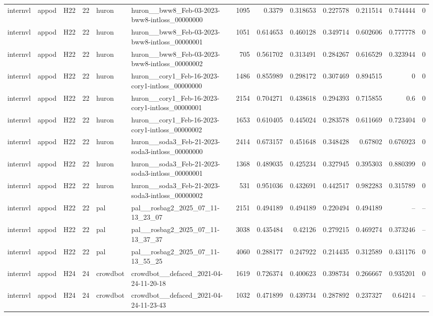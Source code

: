 \begin{longtable}{lllrllrrrrrrr}
internvl & appod & H22 & 22 & huron & huron\_\_bww8\_Feb-03-2023-bww8-intloss\_00000000 & 1095 & 0.3379 & 0.318653 & 0.227578 & 0.211514 & 0.744444 & 0 \\
internvl & appod & H22 & 22 & huron & huron\_\_bww8\_Feb-03-2023-bww8-intloss\_00000001 & 1051 & 0.614653 & 0.460128 & 0.349714 & 0.602606 & 0.777778 & 0 \\
internvl & appod & H22 & 22 & huron & huron\_\_bww8\_Feb-03-2023-bww8-intloss\_00000002 & 705 & 0.561702 & 0.313491 & 0.284267 & 0.616529 & 0.323944 & 0 \\
internvl & appod & H22 & 22 & huron & huron\_\_cory1\_Feb-16-2023-cory1-intloss\_00000000 & 1486 & 0.855989 & 0.298172 & 0.307469 & 0.894515 & 0 & 0 \\
internvl & appod & H22 & 22 & huron & huron\_\_cory1\_Feb-16-2023-cory1-intloss\_00000001 & 2154 & 0.704271 & 0.438618 & 0.294393 & 0.715855 & 0.6 & 0 \\
internvl & appod & H22 & 22 & huron & huron\_\_cory1\_Feb-16-2023-cory1-intloss\_00000002 & 1653 & 0.610405 & 0.445024 & 0.283578 & 0.611669 & 0.723404 & 0 \\
internvl & appod & H22 & 22 & huron & huron\_\_soda3\_Feb-21-2023-soda3-intloss\_00000000 & 2414 & 0.673157 & 0.451648 & 0.348428 & 0.67802 & 0.676923 & 0 \\
internvl & appod & H22 & 22 & huron & huron\_\_soda3\_Feb-21-2023-soda3-intloss\_00000001 & 1368 & 0.489035 & 0.425234 & 0.327945 & 0.395303 & 0.880399 & 0 \\
internvl & appod & H22 & 22 & huron & huron\_\_soda3\_Feb-21-2023-soda3-intloss\_00000002 & 531 & 0.951036 & 0.432691 & 0.442517 & 0.982283 & 0.315789 & 0 \\
internvl & appod & H22 & 22 & pal & pal\_\_rosbag2\_2025\_07\_11-13\_23\_07 & 2151 & 0.494189 & 0.494189 & 0.220494 & 0.494189 & -- & -- \\
internvl & appod & H22 & 22 & pal & pal\_\_rosbag2\_2025\_07\_11-13\_37\_37 & 3038 & 0.435484 & 0.42126 & 0.279215 & 0.469274 & 0.373246 & -- \\
internvl & appod & H22 & 22 & pal & pal\_\_rosbag2\_2025\_07\_11-13\_55\_25 & 4060 & 0.288177 & 0.247922 & 0.214435 & 0.312589 & 0.431176 & 0 \\
internvl & appod & H24 & 24 & crowdbot & crowdbot\_\_defaced\_2021-04-24-11-20-18 & 1619 & 0.726374 & 0.400623 & 0.398734 & 0.266667 & 0.935201 & 0 \\
internvl & appod & H24 & 24 & crowdbot & crowdbot\_\_defaced\_2021-04-24-11-23-43 & 1032 & 0.471899 & 0.439734 & 0.287892 & 0.237327 & 0.64214 & -- \\

\end{longtable}
